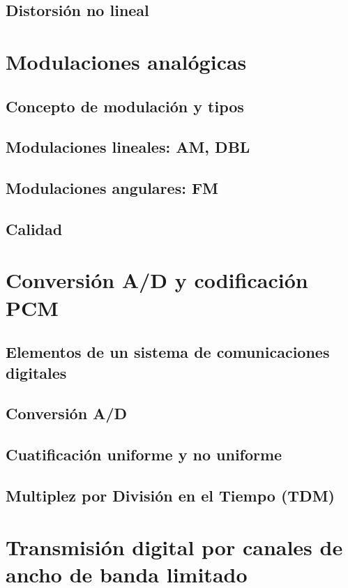 \documentclass[a4paper]{book}
\begin{document}
\section{Distorsión no lineal}

\chapter{Modulaciones analógicas}
\section{Concepto de modulación y tipos}
\section{Modulaciones lineales: AM, DBL}
\section{Modulaciones angulares: FM}
\section{Calidad}

\chapter{Conversión A/D y codificación PCM}
\section{\texorpdfstring{Elementos de un sistema de comunicaciones\\ digitales}{Elementos de un sistema de comunicaciones digitales}}
\section{Conversión A/D}
\section{Cuatificación uniforme y no uniforme}
\section{Multiplez por División en el Tiempo (TDM)}

\chapter{Transmisión digital por canales de ancho de banda limitado}
\end{document}
